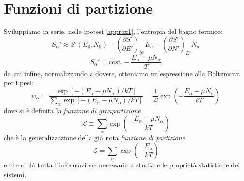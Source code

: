 \documentclass[a4paper]{report}
\newcommand\ddfrac[2]{\frac{\displaystyle #1}{\displaystyle #2}}
\begin{document}
\section{Funzioni di partizione}

Sviluppiamo in serie, nelle ipotesi \eqref{approx1}, l'entropia del bagno termico:
\begin{equation}
    S_\alpha' \approx S'(E_0,N_0) - \left(\frac{\partial S'}{\partial E'}\right)_{N'} E_\alpha  - \left(\frac{\partial S'}{\partial N'}\right)_{E'} N_\alpha
\end{equation}
\begin{equation}
    S_\alpha' = \text{cost.} - \frac{E_\alpha-\mu N_\alpha}{T}
\end{equation}
da cui infine, normalizzando a dovere, otteniamo un'espressione alla Boltzmann per i pesi:
\begin{equation}
    w_\alpha = \ddfrac{\exp\left[-(E_\alpha-\mu N_\alpha)/k T\right]}{\sum_\alpha \exp\left[-(E_\alpha-\mu N_\alpha)/k T \right]} = \frac{1}{\mathcal{L}}\exp\left(-\frac{E_\alpha-\mu N_\alpha}{k T}\right)
\end{equation}
dove si è definita la \textit{funzione di granpartizione}
\begin{equation}
    \mathcal{L} \equiv \sum_\alpha \exp\left(-\frac{E_\alpha-\mu N_\alpha}{k T}\right)
    \label{granpartizione}
\end{equation}
che è la generalizzazione della già nota \textit{funzione di partizione}
\begin{equation}
    \mathcal{Z} = \sum_\alpha \exp\left(-\frac{E_\alpha}{k T}\right)
    \label{partizione}
\end{equation}
e che ci dà tutta l'informazione necessaria a studiare le proprietà statistiche dei sistemi.
\end{document}
